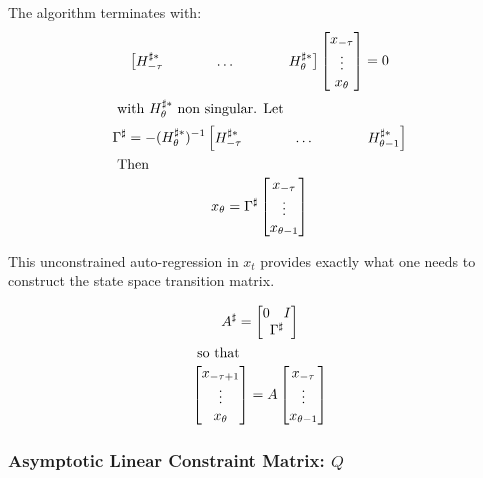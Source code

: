\documentclass[12pt]{article}
\begin{document}
The algorithm terminates with:
\begin{gather}\label{eq:easy}
  \begin{bmatrix}
    \hsh
  \end{bmatrix} 
  \begin{bmatrix}
    x_{-\tau}\\ \vdots \\x_{\theta}
  \end{bmatrix} =0%
   \\ \intertext{ with $H^{\sharp\ast}_{\theta}$ non singular. Let} 
\Gamma^\sharp=-  (H^{\sharp\ast}_{\theta})^{-1}\begin{bmatrix}
    \hshShort
  \end{bmatrix} \\ \intertext{ Then }
x_{\theta} = 
 \Gamma^\sharp
  \begin{bmatrix}
    x_{-\tau}\\ \vdots \\x_{\theta-1}
  \end{bmatrix}  %
\end{gather}

This unconstrained auto-regression in $x_t$ provides exactly what one needs to
construct the state space transition matrix. 



\begin{gather}
A^\sharp= 
\begin{bmatrix}
  \begin{matrix}
    0&I
  \end{matrix}\\ \Gamma^\sharp
\end{bmatrix}\\ \intertext{ so that }
  \begin{bmatrix}
    x_{-\tau+1}\\ \vdots \\x_{\theta}
  \end{bmatrix}  = A
  \begin{bmatrix}
    x_{-\tau}\\ \vdots \\x_{\theta-1}
  \end{bmatrix} 
\end{gather}







\subsubsection{Asymptotic Linear Constraint Matrix: $Q$}
\label{asymQ}
\end{document}
